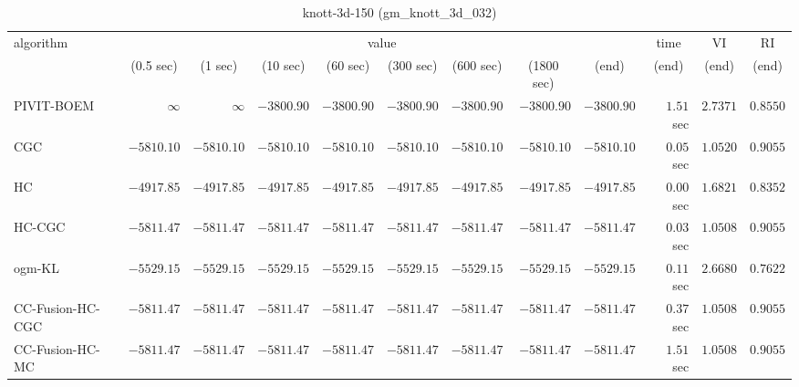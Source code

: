 \begin{table}[H]
\scriptsize
\centering
\caption{knott-3d-150 (gm\_knott\_3d\_032)}
\label{tab:anytimetable-knott-3d-150-gm-knott-3d-032}
\begin{tabular}{lrrrrrrrrrrr}
\toprule
           algorithm &                                   \multicolumn{8}{c}{value} & \multicolumn{1}{c}{time}    & \multicolumn{1}{c}{VI}  & \multicolumn{1}{c}{RI} \\  
\cmidrule(lr){2-9}\cmidrule(lr){10-10} \cmidrule(lr){11-11} \cmidrule(lr){12-12}   
                     & \multicolumn{1}{c}{(0.5 sec)} & \multicolumn{1}{c}{(1 sec)} & \multicolumn{1}{c}{(10 sec)} & \multicolumn{1}{c}{(60 sec)} & \multicolumn{1}{c}{(300 sec)} & \multicolumn{1}{c}{(600 sec)} & \multicolumn{1}{c}{(1800 sec)} & \multicolumn{1}{c}{(end)} & \multicolumn{1}{c}{(end)}    & \multicolumn{1}{c}{(end)}   & \multicolumn{1}{c}{(end)}  \\ \midrule 
          PIVIT-BOEM & $\infty$ & $\infty$ & $     -3800.90$ & $     -3800.90$ & $     -3800.90$ & $     -3800.90$ & $     -3800.90$ & $     -3800.90$ & $         1.51$ sec    & $       2.7371$  & $       0.8550$ \\ 
                 CGC & $     -5810.10$ & $     -5810.10$ & $     -5810.10$ & $     -5810.10$ & $     -5810.10$ & $     -5810.10$ & $     -5810.10$ & $     -5810.10$ & $         0.05$ sec    & $       1.0520$  & $       0.9055$ \\ 
                  HC & $     -4917.85$ & $     -4917.85$ & $     -4917.85$ & $     -4917.85$ & $     -4917.85$ & $     -4917.85$ & $     -4917.85$ & $     -4917.85$ & $         0.00$ sec    & $       1.6821$  & $       0.8352$ \\ 
              HC-CGC & $     -5811.47$ & $     -5811.47$ & $     -5811.47$ & $     -5811.47$ & $     -5811.47$ & $     -5811.47$ & $     -5811.47$ & $     -5811.47$ & $         0.03$ sec    & $       1.0508$  & $       0.9055$ \\ 
              ogm-KL & $     -5529.15$ & $     -5529.15$ & $     -5529.15$ & $     -5529.15$ & $     -5529.15$ & $     -5529.15$ & $     -5529.15$ & $     -5529.15$ & $         0.11$ sec    & $       2.6680$  & $       0.7622$ \\ 
    CC-Fusion-HC-CGC & $     -5811.47$ & $     -5811.47$ & $     -5811.47$ & $     -5811.47$ & $     -5811.47$ & $     -5811.47$ & $     -5811.47$ & $     -5811.47$ & $         0.37$ sec    & $       1.0508$  & $       0.9055$ \\ 
     CC-Fusion-HC-MC & $     -5811.47$ & $     -5811.47$ & $     -5811.47$ & $     -5811.47$ & $     -5811.47$ & $     -5811.47$ & $     -5811.47$ & $     -5811.47$ & $         1.51$ sec    & $       1.0508$  & $       0.9055$ \\ 

\end{tabular}
\end{table}
